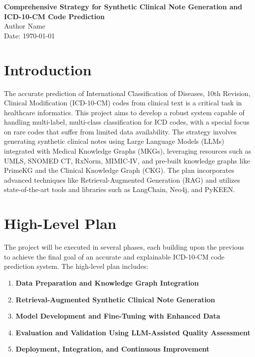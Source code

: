 \documentclass[12pt, a4paper]{article}
\begin{document}
\begin{center}
    \LARGE{\textbf{Comprehensive Strategy for Synthetic Clinical Note Generation and ICD-10-CM Code Prediction}}\\[1cm]
    \large{Author Name}\\
    \large{Date: \today}
\end{center}

\tableofcontents
\newpage

\section{Introduction}

The accurate prediction of International Classification of Diseases, 10th Revision, Clinical Modification (ICD-10-CM) codes from clinical text is a critical task in healthcare informatics. This project aims to develop a robust system capable of handling multi-label, multi-class classification for ICD codes, with a special focus on rare codes that suffer from limited data availability. The strategy involves generating synthetic clinical notes using Large Language Models (LLMs) integrated with Medical Knowledge Graphs (MKGs), leveraging resources such as UMLS, SNOMED CT, RxNorm, MIMIC-IV, and pre-built knowledge graphs like PrimeKG and the Clinical Knowledge Graph (CKG). The plan incorporates advanced techniques like Retrieval-Augmented Generation (RAG) and utilizes state-of-the-art tools and libraries such as LangChain, Neo4j, and PyKEEN.

\section{High-Level Plan}

The project will be executed in several phases, each building upon the previous to achieve the final goal of an accurate and explainable ICD-10-CM code prediction system. The high-level plan includes:

\begin{enumerate}
    \item \textbf{Data Preparation and Knowledge Graph Integration}
    \item \textbf{Retrieval-Augmented Synthetic Clinical Note Generation}
    \item \textbf{Model Development and Fine-Tuning with Enhanced Data}
    \item \textbf{Evaluation and Validation Using LLM-Assisted Quality Assessment}
    \item \textbf{Deployment, Integration, and Continuous Improvement}
\end{enumerate}
\end{document}
